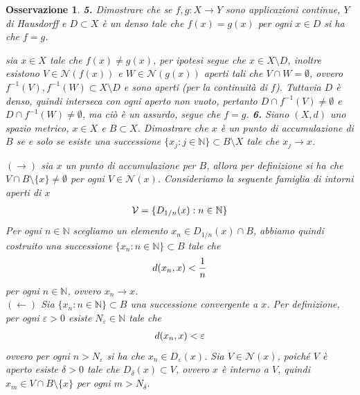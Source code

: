 \documentclass[oneside, 11pt]{amsbook}
\makeatletter
\newcommand{\0}{{(0)}}
\newcommand{\3}{{(3)}}
\theoremstyle{colonplain}
\theoremstyle{colondefinition}
\theoremstyle{colonremark}
\newtheorem{rmk}[thm]{Osservazione}
\numberwithin{equation}{chapter}
\renewcommand{\proofname}{Dimostrazione}
\renewenvironment{proof}[1][\proofname]{\par
  \pushQED{\end{proof}}%
  \normalfont \topsep6\p@\@plus6\p@\relax
  \trivlist
  \item[\hskip\labelsep\bfseries #1:]\ignorespaces
}{%
  \popQED\endtrivlist\@endpefalse
}
\makeatother
\begin{document}
\begin{rmk}
\textbf{5.} Dimostrare che se $f, g : X \longrightarrow Y$ sono applicazioni continue, $Y$ di Hausdorff e $D \subset X$ è un denso tale che $f(x) = g(x)$ per ogni $x \in D$ si ha che $f = g$.
\begin{proof}
sia $x \in X$ tale che $f(x) \neq g(x)$, per ipotesi segue che $x \in X \setminus D$, inoltre esistono $V \in \mathcal{N}(f(x))$ e $W \in \mathcal{N}(g(x))$ aperti tali che $V \cap W = \emptyset$, ovvero $f^{-1}(V), f^{-1}(W) \subset X \setminus D$ e sono aperti (per la continuità di $f$). Tuttavia $D$ è denso, quindi interseca con ogni aperto non vuoto, pertanto $D \cap f^{-1}(V) \neq \emptyset$ e $D \cap f^{-1}(W) \neq \emptyset$, ma ciò è un assurdo, segue che $f = g$.
\end{proof}
\textbf{6.} Siano $(X, d)$ uno spazio metrico, $x \in X$ e $B \subset X$. Dimostrare che $x$ è un punto di accumulazione di $B$ se e solo se esiste una successione $\{x_j : j \in \mathbb{N}\} \subset B\setminus X$ tale che $x_j \rightarrow x$.
\begin{proof}
$(\rightarrow)$ sia $x$ un punto di accumulazione per $B$, allora per definizione si ha che $V \cap B \setminus \{x\} \neq \emptyset$ per ogni $V \in \mathcal{N}(x)$. Consideriamo la seguente famiglia di intorni aperti di $x$
\begin{align}
    \mathcal{V} = \{D_{1/n}(x) : n \in \mathbb{N}\} \notag
\end{align}
Per ogni $n \in \mathbb{N}$ scegliamo un elemento $x_n \in D_{1/n}(x) \cap B$, abbiamo quindi costruito una successione $\{x_n : n \in \mathbb{N}\} \subset B$ tale che
\begin{align}
    d(x_n, x) < \frac{1}{n} \notag
\end{align}
per ogni $n \in \mathbb{N}$, ovvero $x_n \rightarrow x$. \\
$(\leftarrow)$ Sia $\{x_n : n \in \mathbb{N}\} \subset B$ una successione convergente a $x$. Per definizione, per ogni $\varepsilon > 0$ esiste $N_\varepsilon \in \mathbb{N}$ tale che
\begin{align}
    d(x_n, x) < \varepsilon \notag
\end{align}
ovvero per ogni $n > N_\varepsilon$ si ha che $x_n \in D_{\varepsilon}(x)$. Sia $V \in \mathcal{N}(x)$, poiché $V$ è aperto esiste $\delta > 0$ tale che $D_\delta(x) \subset V$, ovvero $x$ è interno a $V$, quindi $x_m \in V \cap B \setminus \{x\}$ per ogni $m > N_\delta$.
\end{proof}

\newpage

\end{rmk}
\end{document}
